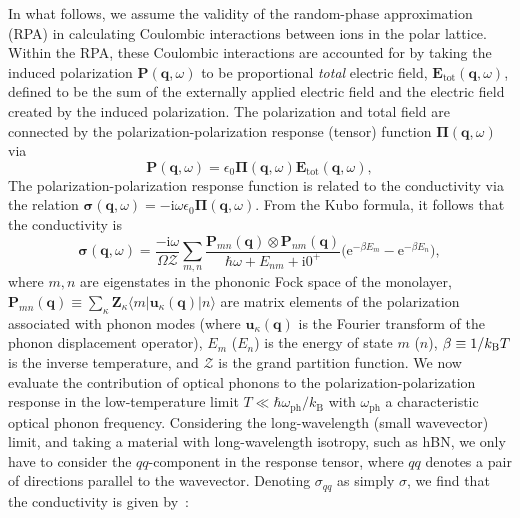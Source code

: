 \documentclass[aps,prb,twocolumn,
	           groupedaddress,superscriptaddress,
               amsfonts,amssymb,amsmath,floatfix,
	           citeautoscript]{revtex4-1}
\newcommand{\iu}{\mathrm{i}}
\newcommand{\e}{\mathrm{e}}
\begin{document}
In what follows, we assume the validity of the random-phase approximation (RPA) in calculating Coulombic interactions between ions in the polar lattice. Within the RPA, these Coulombic interactions are accounted for by taking the induced polarization $\mathbf{P}(\mathbf{q},\omega)$ to be proportional \emph{total} electric field, $\mathbf{E}_{\mathrm{tot}}(\mathbf{q},\omega)$, defined to be the sum of the externally applied electric field and the electric field created by the induced polarization. The polarization and total field are connected by the polarization-polarization response (tensor) function  $\boldsymbol{\Pi}(\mathbf{q},\omega)$ via
\begin{equation}
\mathbf{P}(\mathbf{q},\omega)  = \epsilon_0\boldsymbol{\Pi}(\mathbf{q},\omega)\mathbf{E}_{\mathrm{tot}}(\mathbf{q},\omega),
\end{equation}
The polarization-polarization response function is related to the conductivity via the relation $\boldsymbol{\sigma}(\mathbf{q},\omega) = -\iu\omega\epsilon_0\boldsymbol{\Pi}(\mathbf{q},\omega)$. From the Kubo formula, it follows that the conductivity is
\begin{equation}\label{eq:2dsusceptibility}
    \boldsymbol{\sigma}(\mathbf{q},\omega) =  \frac{-\iu \omega}{ \Omega\mathcal{Z}}\sum\limits_{m,n}\frac{\mathbf{P}_{mn}(\mathbf{q})\otimes\mathbf{P}_{nm}(\mathbf{q})}{\hbar\omega + E_{nm}+\iu 0^+}\Big(\e^{-\beta E_m}-\e^{-\beta E_n} \Big),
\end{equation}
where $m,n$ are eigenstates in the phononic Fock space of the monolayer, $\mathbf{P}_{mn}(\mathbf{q}) \equiv \sum_\kappa \mathbf{Z}_\kappa\langle m|\mathbf{u}_\kappa(\mathbf{q})|n\rangle$ are matrix elements of the polarization associated with phonon modes (where $\mathbf{u}_\kappa(\mathbf{q})$ is the Fourier transform of the phonon displacement operator), $E_{m}$ ($E_n$) is the energy of state $m$ ($n$), $\beta \equiv 1/k_{\text{\textsc{B}}}T$ is the inverse temperature, and $\mathcal{Z}$ is the grand partition function. We now evaluate the contribution of optical phonons to the polarization-polarization response in the low-temperature limit $T \ll \hbar\omega_{\mathrm{ph}}/k_{\mathrm{B}}$ with $\omega_{\mathrm{ph}}$ a characteristic optical phonon frequency.  Considering the long-wavelength (small wavevector) limit, and taking a material with long-wavelength isotropy, such as hBN, we only have to consider the $qq$-component in the response tensor, where $qq$ denotes a pair of directions parallel to the wavevector. Denoting $\sigma_{qq}$ as simply $\sigma$, we find that the conductivity is given by~\cite{rivera2018ab}: 
\end{document}
